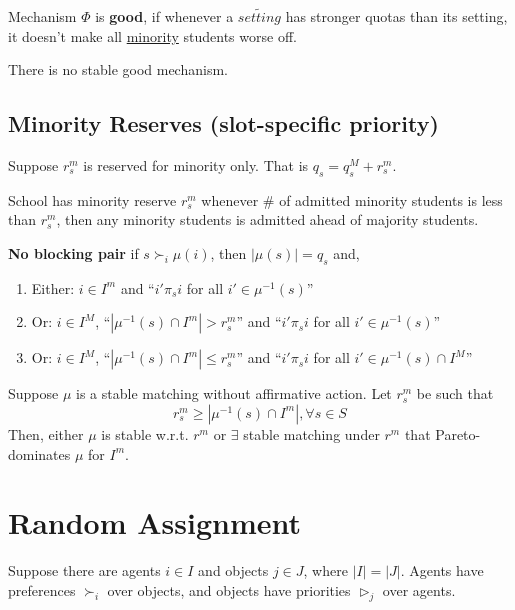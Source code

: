 \documentclass[11pt]{elegantbook}
\begin{document}
\begin{definition}
    \normalfont
    Mechanism $\Phi$ is \textbf{good}, if whenever a $\tilde{setting}$ has stronger quotas than its setting, it doesn't make all \underline{minority} students worse off.
\end{definition}


\begin{theorem}[Kojima 2012]
    There is no stable good mechanism.
\end{theorem}

\subsection{Minority Reserves (slot-specific priority)}
Suppose $r_s^m$ is reserved for minority only. That is $q_s=q_s^M+r_s^m$.
\begin{definition}
    \normalfont
     School has minority reserve $r_s^m$ whenever $\#$ of admitted minority students is less than $r_s^m$, then any minority students is admitted ahead of majority students.
\end{definition}
\begin{definition}
    \normalfont
    \textbf{No blocking pair} if $s\succ_i \mu(i)$, then $|\mu(s)|=q_s$ and,
    \begin{enumerate}
        \item Either: $i\in I^m$ and ``$i'\pi_s i$ for all $i'\in \mu^{-1}(s)$''
        \item Or: $i\in I^M$, ``$|\mu^{-1}(s)\cap I^m| > r_s^m$'' and ``$i'\pi_s i$ for all $i'\in \mu^{-1}(s)$''
        \item Or: $i\in I^M$, ``$|\mu^{-1}(s)\cap I^m| \leq r_s^m$'' and ``$i'\pi_s i$ for all $i'\in \mu^{-1}(s)\cap I^M$''
    \end{enumerate}
\end{definition}

\begin{theorem}
    Suppose $\mu$ is a stable matching without affirmative action. Let $r_s^m$ be such that $$r_s^m\geq |\mu^{-1}(s)\cap I^m|, \forall s\in S$$
    Then, either $\mu$ is stable w.r.t. $r^m$ or $\exists$ stable matching under $r^m$ that Pareto-dominates $\mu$ for $I^m$.
\end{theorem}


\section{Random Assignment}
Suppose there are agents $i\in I$ and objects $j\in J$, where $|I|=|J|$. Agents have preferences $\succ_i$ over objects, and objects have priorities $\rhd_j$ over agents.
\end{document}
